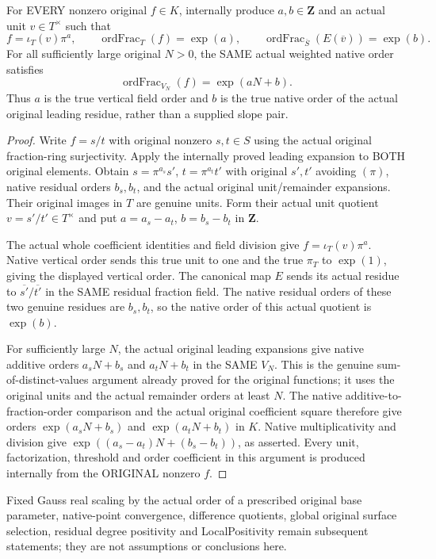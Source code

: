 \begin{theorem}
\label{thm:gauss-surface-original-fraction-eventual-orders}
\leanok
\leavevmode\par
For EVERY nonzero original $f\in K$, internally produce $a,b\in\mathbf Z$
and an actual unit $v\in T^\times$ such that
\[
 f=\iota_T(v)\pi^a,\qquad
 \operatorname{ordFrac}_T(f)=\exp(a),\qquad
 \operatorname{ordFrac}_{\overline S}(E(\overline v))=\exp(b).
\]
For all sufficiently large original $N>0$, the SAME actual weighted native
order satisfies
\[
 \operatorname{ordFrac}_{V_N}(f)=\exp(aN+b).
\]
Thus $a$ is the true vertical field order and $b$ is the true native order
of the actual original leading residue, rather than a supplied slope pair.
\end{theorem}
\begin{proof}
Write $f=s/t$ with original nonzero $s,t\in S$ using the actual original
fraction-ring surjectivity. Apply the internally proved leading expansion
to BOTH original elements. Obtain
$s=\pi^{a_s}s'$, $t=\pi^{a_t}t'$ with original $s',t'$ avoiding $(\pi)$,
native residual orders $b_s,b_t$, and the actual original unit/remainder
expansions. Their original images in $T$ are genuine units. Form their actual
unit quotient $v=s'/t'\in T^\times$ and put
$a=a_s-a_t$, $b=b_s-b_t$ in $\mathbf Z$.

The actual whole coefficient identities and field division give
$f=\iota_T(v)\pi^a$. Native vertical order sends this true unit to one and
the true $\pi_T$ to $\exp(1)$, giving the displayed vertical order.
The canonical map $E$ sends its actual residue to
$\overline{s'}/\overline{t'}$ in the SAME residual fraction field. The native
residual orders of these two genuine residues are $b_s,b_t$, so the native
order of this actual quotient is $\exp(b)$.

For sufficiently large $N$, the actual original leading expansions give
native additive orders $a_sN+b_s$ and $a_tN+b_t$ in the SAME $V_N$.
This is the genuine sum-of-distinct-values argument already proved for the
original functions; it uses the original units and the actual remainder
orders at least $N$. The native additive-to-fraction-order comparison and
the actual original coefficient square therefore give orders
$\exp(a_sN+b_s)$ and $\exp(a_tN+b_t)$ in $K$. Native multiplicativity and
division give $\exp((a_s-a_t)N+(b_s-b_t))$, as asserted. Every unit,
factorization, threshold and order coefficient in this argument is produced
internally from the ORIGINAL nonzero $f$.
\end{proof}

Fixed Gauss real scaling by the actual order of a prescribed original base
parameter, native-point convergence, difference quotients, global original
surface selection, residual degree positivity and LocalPositivity remain
subsequent statements; they are not assumptions or conclusions here.
